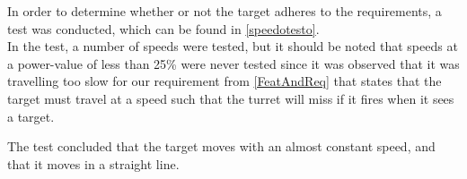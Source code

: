 In order to determine whether or not the target adheres to the requirements, a
test was conducted, which can be found in \autoref{speedotesto}.\\
In the test, a number of speeds were tested, but it should be noted that speeds
at a power-value of less than 25\% were never tested since it was observed that
it was travelling too slow for our requirement from \autoref{FeatAndReq} that
states that the target must travel at a speed such that the turret will miss if
it fires when it sees a target.\nl

The test concluded that the target moves with an almost constant speed, and that
it moves in a straight line.
